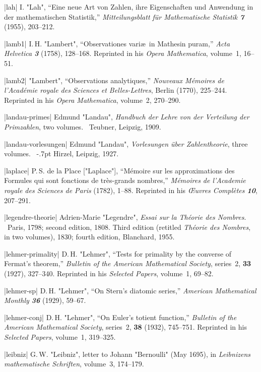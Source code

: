 \bib|lah|%
I. "Lah", ``Eine neue Art von Zahlen, ihre Eigenschaften und Anwendung
in der mathematischen Statistik,'' {\sl Mitteilungsblatt f\"ur
Mathematische Statistik\/ \bf7} (1955), 203--212.

\bib|lamb1|%
I.\,H. "Lambert", ``Observationes vari\ae\ in Mathesin puram,''
{\sl Acta Helvetica\/ \bf3} (1758), 128--168. Reprinted in his
{\sl Opera Mathematica}, volume~1, \hbox{16--51}.

\bib|lamb2|%
"Lambert", ``Observations analytiques,''
{\sl Nouveaux M\'emoires de l'Acad\-\'emie royale des Sciences et
Belles-Lettres}, Berlin (1770), 225--244. Reprinted in his
{\sl Opera Mathematica}, volume~2, 270--290.

\bib|landau-primes|%
Edmund "Landau", {\sl Handbuch der Lehre von der Verteilung der Prim\-zahlen},
two volumes. \
Teubner, Leipzig, 1909.

\bib|landau-vorlesungen|%
Edmund "Landau", {\sl Vorlesungen \"uber Zahlentheorie}, three volumes. \
\kern-.7pt Hirzel, Leipzig, 1927.

\bib|laplace|%
P.\,S. de la Place ["Laplace"], ``M\'emoire sur les approximations
des Formules
qui sont fonctions de tr\`es-grands nombres,'' {\sl M\'emoires de l'Academie
royale des Sciences de Paris\/} (1782), 1--88. Reprinted in his
{\sl \OE uvres Compl\`etes\/ \bf10}, 207--291.

\bib|legendre-theorie|%
Adrien-Marie "Legendre", {\sl Essai sur la Th\'eorie des Nombres}. \
Paris, 1798; second edition, 1808. Third edition (retitled {\sl Th\'eorie
des Nombres}, in two volumes), 1830; fourth edition, Blanchard, 1955.

\bib|lehmer-primality|%
D.\,H. "Lehmer", ``Tests for primality by the converse of Fermat's theorem,''
{\sl Bulletin of the American Mathematical Society}, series~2,
{\bf33} (1927), 327--340. Reprinted in his {\sl Selected Papers}, volume~1,
69--82.

\bib|lehmer-sp|%
D.\,H. "Lehmer", ``On Stern's diatomic series,''
{\sl American Mathematical Monthly\/ \bf36} (1929), 59--67.

\bib|lehmer-conj|%
D.\,H. "Lehmer", ``On Euler's totient function,''
{\sl Bulletin of the American Mathematical Society}, series~2,
{\bf38} (1932), 745--751. Reprinted in his {\sl Selected Papers}, volume~1,
319--325.

\bib|leibniz|%
G.\,W. "Leibniz", letter to Johann "Bernoulli" (May 1695), in
{\sl Leibnizens mathematische Schriften}, volume~3, 174--179.

